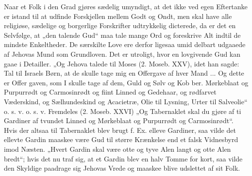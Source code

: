 \documentclass[12pt]{book}
\newcommand{\opage}[1]{\marginnote{\footnotesize\textit{[#1]}}}
\begin{document}
Naar et Folk i den Grad gjøres sædelig umyndigt,
at det ikke ved egen Eftertanke er istand til at udfinde
Forskjellen mellem Godt og Ondt, men skal have alle
\opage{180}\setcounter{footnote}{0}%
religiøse, sædelige og borgerlige Forskrifter udtrykkelig
dicterede, da er det en Selvfølge, at „den talende Gud“
maa tale mange Ord og foreskrive Alt indtil de mindste
Enkeltheder. De særskilte Love ere derfor ligesaa umid\-%
delbart udgaaede af Jehovas Mund som Grundloven.
Det er utroligt, hvor en lovgivende Gud kan gaae i
Detailler. „Og Jehova talede til Moses (2. Moseb. XXV),
idet han sagde: Tal til Israels Børn, at de skulle tage
mig en Offergave af hver Mand ... Og dette er Offer\-%
gaven, som I skulle tage af dem, Guld og Sølv og Kob\-%
ber. Mørkeblaat og Purpurrødt og Carmosinrødt og
fiint Linned og Gedehaar, og rødfarvet Væderskind, og
Sælhundeskind og Acacietræ, Olie til Lysning, Urter til
Salveolie“ o. s. v. o. s. v. Fremdeles (2. Moseb. XXVI)
„Og Tabernaklet skal du gjøre af ti Gardiner af tvundet
Linned og Mørkeblaat og Purpurrødt og Carmosinrødt“.
Hvis der altsaa til Tabernaklet blev brugt f. Ex. elleve
Gardiner, saa vilde det ellevte Gardin maaskee være Gud
til større Krænkelse end et falsk Vidnesbyrd imod Næsten.
„Hvert Gardin skal være otte og tyve Alen langt og otte
Alen bredt“; hvis det nu traf sig, at et Gardin blev en
halv Tomme for kort, saa vilde den Skyldige paadrage
sig Jehovas Vrede og maaskee blive udslettet af sit Folk.
\end{document}

